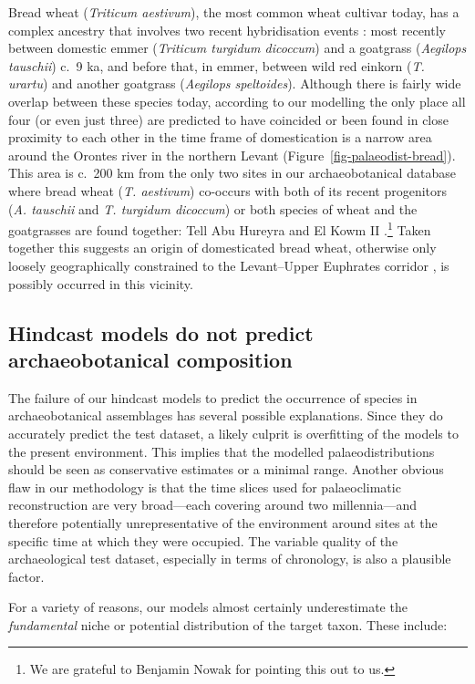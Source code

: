 \documentclass[
  authoryear,
  preprint]{elsarticle}
\begin{document}
Bread wheat (\emph{Triticum aestivum}), the most common wheat cultivar
today, has a complex ancestry that involves two recent hybridisation
events \citep{LevyFeldman2022}: most recently between domestic emmer
(\emph{Triticum turgidum dicoccum}) and a goatgrass (\emph{Aegilops
tauschii}) c.~9 ka, and before that, in emmer, between wild red einkorn
(\emph{T. urartu}) and another goatgrass (\emph{Aegilops speltoides}).
Although there is fairly wide overlap between these species today,
according to our modelling the only place all four (or even just three)
are predicted to have coincided or been found in close proximity to each
other in the time frame of domestication is a narrow area around the
Orontes river in the northern Levant
(Figure~\ref{fig-palaeodist-bread}). This area is c.~200 km from the
only two sites in our archaeobotanical database where bread wheat
(\emph{T. aestivum}) co-occurs with both of its recent progenitors
(\emph{A. tauschii} and \emph{T. turgidum dicoccum}) or both species of
wheat and the goatgrasses are found together: Tell Abu Hureyra and El
Kowm II \citep{ArranzOtaeguiRoe2023}.\footnote{We are grateful to
  Benjamin Nowak for pointing this out to us.} Taken together this
suggests an origin of domesticated bread wheat, otherwise only loosely
geographically constrained to the Levant--Upper Euphrates corridor
\citep{LevyFeldman2022}, is possibly occurred in this vicinity.

\subsection{Hindcast models do not predict archaeobotanical
composition}\label{sec-discuss-hindcasting}

The failure of our hindcast models to predict the occurrence of species
in archaeobotanical assemblages has several possible explanations. Since
they do accurately predict the test dataset, a likely culprit is
overfitting of the models to the present environment. This implies that
the modelled palaeodistributions should be seen as conservative
estimates or a minimal range. Another obvious flaw in our methodology is
that the time slices used for palaeoclimatic reconstruction are very
broad---each covering around two millennia---and therefore potentially
unrepresentative of the environment around sites at the specific time at
which they were occupied. The variable quality of the archaeological
test dataset, especially in terms of chronology, is also a plausible
factor.

For a variety of reasons, our models almost certainly underestimate the
\emph{fundamental} niche or potential distribution of the target taxon.
These include:
\end{document}
